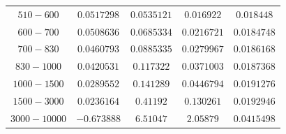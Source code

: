 \documentclass[11pt]{article}
\begin{document}
\begin{table}[htbp]
{\begin{tabular}{ccccc}
		$510-600$ & $0.0517298$ & $0.0535121$   & $0.016922$    & $0.018448$ \\
		$600-700$ & $0.0508636$ & $0.0685334$   & $0.0216721$   & $0.0184748$ \\
		$700-830$ & $0.0460793$ & $0.0885335$   & $0.0279967$   & $0.0186168$ \\
		$830-1000$ & $0.0420531$ & $0.117322$   & $0.0371003$   & $0.0187368$ \\
		$1000-1500$ & $0.0289552$ & $0.141289$  & $0.0446794$   & $0.0191276$ \\
		$1500-3000$ & $0.0236164$ & $0.41192$   & $0.130261$    & $0.0192946$ \\
		$3000-10000$ & $-0.673888$ & $6.51047$  & $2.05879$     & $0.0415498$ \\
	\bottomrule
	\end{tabular}
}
\end{table}
\end{document}
